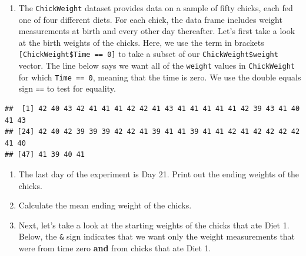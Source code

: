 \documentclass[]{article}
\newenvironment{Shaded}{\begin{snugshade}}{\end{snugshade}}
\newcommand{\DecValTok}[1]{\textcolor[rgb]{0.00,0.00,0.81}{#1}}
\newcommand{\NormalTok}[1]{#1}
\newcommand{\OperatorTok}[1]{\textcolor[rgb]{0.81,0.36,0.00}{\textbf{#1}}}
\newcommand{\StringTok}[1]{\textcolor[rgb]{0.31,0.60,0.02}{#1}}
\providecommand{\tightlist}{%
  \setlength{\itemsep}{0pt}\setlength{\parskip}{0pt}}
\begin{document}
\begin{enumerate}
\def\labelenumi{\arabic{enumi}.}
\tightlist
\item
  The \texttt{ChickWeight} dataset provides data on a sample of fifty
  chicks, each fed one of four different diets. For each chick, the data
  frame includes weight measurements at birth and every other day
  thereafter. Let's first take a look at the birth weights of the
  chicks. Here, we use the term in brackets
  \texttt{{[}ChickWeight\$Time\ ==\ 0{]}} to take a subset of our
  \texttt{ChickWeight\$weight} vector. The line below says we want all
  of the \texttt{weight} values in \texttt{ChickWeight} for which
  \texttt{Time\ ==\ 0}, meaning that the time is zero. We use the double
  equals sign \texttt{==} to test for equality.
\end{enumerate}

\begin{Shaded}
\end{Shaded}

\begin{verbatim}
##  [1] 42 40 43 42 41 41 41 42 42 41 43 41 41 41 41 41 42 39 43 41 40 41 43
## [24] 42 40 42 39 39 39 42 42 41 39 41 41 39 41 41 42 41 42 42 42 42 41 40
## [47] 41 39 40 41
\end{verbatim}

\begin{enumerate}
\def\labelenumi{\arabic{enumi}.}
\setcounter{enumi}{1}
\item
  The last day of the experiment is Day 21. Print out the ending weights
  of the chicks.
\item
  Calculate the mean ending weight of the chicks.
\item
  Next, let's take a look at the starting weights of the chicks that ate
  Diet 1. Below, the \texttt{\&} sign indicates that we want only the
  weight measurements that were from time zero \textbf{and} from chicks
  that ate Diet 1.
\end{enumerate}

\begin{Shaded}
\end{Shaded}
\end{document}

